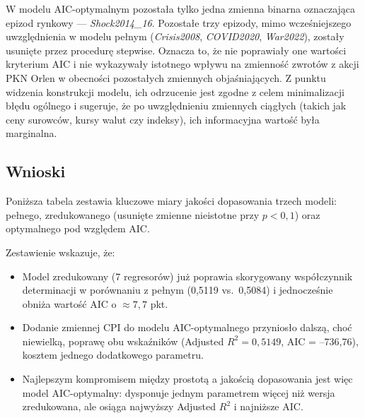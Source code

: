 \documentclass[12pt, twoside]{article}
\begin{document}
W modelu AIC-optymalnym pozostała tylko jedna zmienna binarna oznaczająca epizod rynkowy — \textit{Shock2014\_16}. Pozostałe trzy epizody, mimo wcześniejszego uwzględnienia w modelu pełnym (\textit{Crisis2008}, \textit{COVID2020}, \textit{War2022}), zostały usunięte przez procedurę stepwise. Oznacza to, że nie poprawiały one wartości kryterium AIC i nie wykazywały istotnego wpływu na zmienność zwrotów z akcji PKN Orlen w obecności pozostałych zmiennych objaśniających. Z punktu widzenia konstrukcji modelu, ich odrzucenie jest zgodne z celem minimalizacji błędu ogólnego i sugeruje, że po uwzględnieniu zmiennych ciągłych (takich jak ceny surowców, kursy walut czy indeksy), ich informacyjna wartość była marginalna.

\subsection*{Wnioski}

Poniższa tabela zestawia kluczowe miary jakości dopasowania trzech modeli: pełnego, zredukowanego (usunięte zmienne nieistotne przy $p<0{,}1$) oraz optymalnego pod względem AIC.

\begin{table}[ht]
  \centering
  \caption{Porównanie modeli: pełny vs.\ zredukowany vs.\ AIC-optymalny}
  \label{tab:model_comparison}
\end{table}

\noindent Zestawienie wskazuje, że:
\begin{itemize}
  \item Model zredukowany (7 regresorów) już poprawia skorygowany współczynnik determinacji w porównaniu z pełnym (0,5119 vs.\ 0,5084) i jednocześnie obniża wartość AIC o \(\approx7{,}7\) pkt.
  \item Dodanie zmiennej CPI do modelu AIC-optymalnego przyniosło dalszą, choć niewielką, poprawę obu wskaźników (Adjusted \(R^2 = 0,5149\), AIC = –736,76), kosztem jednego dodatkowego parametru.
  \item Najlepszym kompromisem między prostotą a jakością dopasowania jest więc model AIC-optymalny: dysponuje jednym parametrem więcej niż wersja zredukowana, ale osiąga najwyższy Adjusted \(R^2\) i najniższe AIC.
\end{itemize}
\end{document}
